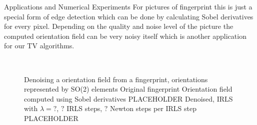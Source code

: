 \begin{chapter}{Applications and Numerical Experiments}
For pictures of fingerprint this is just a special form of edge detection which can be done by calculating Sobel derivatives for every pixel.
Depending on the quality and noise level of the picture the computed orientation field can be very noisy itself which is another application
for our TV algorithms.\\

\begin{figure}[h!]
    \centering
    \\
    \caption[Fingerprint orientation denoising]{Denoising a orientation field from a fingerprint, orientations represented by SO(2) elements
	 Original fingerprint 
	 Orientation field computed using Sobel derivatives PLACEHOLDER
	 Denoised, IRLS with $\lambda=?$, $?$ IRLS steps, $?$ Newton steps per IRLS step PLACEHOLDER
	\label{fig:application_fingerprint1}
    }
\end{figure}


\end{chapter}
